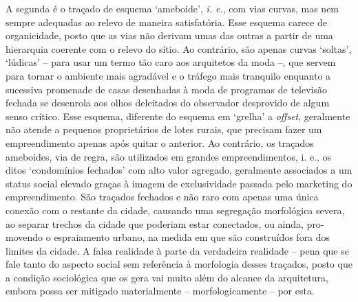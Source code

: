 \documentclass[twoside, 12pt, english,italian,latin,greek,french,spanish,brazil]{book}
\begin{document}
        A segunda é o traçado de esquema ‘ameboide’, \textit{i. e.}, com vias curvas, mas nem sempre adequadas ao relevo de maneira satisfatória. Esse esquema carece de organicidade, posto que as vias não derivam umas das outras a partir de uma hierarquia coerente com o relevo do sítio. Ao contrário, são apenas curvas ‘soltas’, ‘lúdicas’ – para usar um termo tão caro aos arquitetos da moda –, que servem para tornar o ambiente mais agradável e o tráfego mais tranquilo enquanto a sucessiva promenade de casas desenhadas à moda de programas de televisão fechada se desenrola aos olhos deleitados do observador desprovido de algum senso crítico. Esse esquema, diferente do esquema em ‘grelha’ a \textit{offset}, geralmente não atende a pequenos proprietários de lotes rurais, que precisam fazer um empreendimento apenas após quitar o anterior. Ao contrário, os traçados ameboides, via de regra, são utilizados em grandes empreendimentos, i. e., os ditos ‘condomínios fechados’ com alto valor agregado, geralmente associados a um status social elevado graças à imagem de exclusividade passada pelo marketing do empreendimento. São traçados fechados e não raro com apenas uma única conexão com o restante da cidade, causando uma segregação morfológica severa, ao separar trechos da cidade que poderiam estar conectados, ou ainda, pro-movendo o espraiamento urbano, na medida em que são construídos fora dos limites da cidade. A falsa realidade à parte da verdadeira realidade – pena que se fale tanto do aspecto social sem referência à morfologia desses traçados, posto que a condição sociológica que os gera vai muito além do alcance da arquitetura, embora possa ser mitigado materialmente – morfologicamente – por esta.
\end{document}
